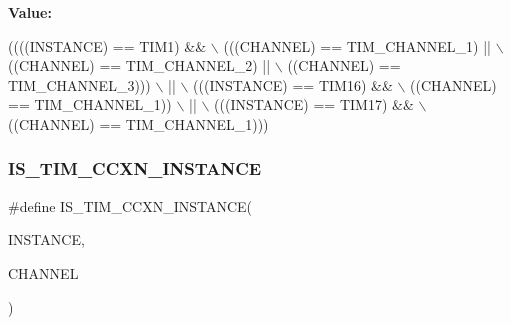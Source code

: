 {\bfseries Value\+:}
\begin{DoxyCode}
((((INSTANCE) == TIM1) &&                    \(\backslash\)
     (((CHANNEL) == TIM\_CHANNEL\_1) ||           \(\backslash\)
      ((CHANNEL) == TIM\_CHANNEL\_2) ||           \(\backslash\)
      ((CHANNEL) == TIM\_CHANNEL\_3)))            \(\backslash\)
    ||                                          \(\backslash\)
    (((INSTANCE) == TIM16) &&                   \(\backslash\)
     ((CHANNEL) == TIM\_CHANNEL\_1))              \(\backslash\)
    ||                                          \(\backslash\)
    (((INSTANCE) == TIM17) &&                   \(\backslash\)
     ((CHANNEL) == TIM\_CHANNEL\_1)))
\end{DoxyCode}
\mbox{\label{group___exported__macro_ga7181cfd1649c4e65e24b7c863e94a54f}} 
\subsubsection{\texorpdfstring{I\+S\+\_\+\+T\+I\+M\+\_\+\+C\+C\+X\+N\+\_\+\+I\+N\+S\+T\+A\+N\+CE}{IS\_TIM\_CCXN\_INSTANCE}\hspace{0.1cm}{\footnotesize\ttfamily [2/16]}}
{\footnotesize\ttfamily \#define I\+S\+\_\+\+T\+I\+M\+\_\+\+C\+C\+X\+N\+\_\+\+I\+N\+S\+T\+A\+N\+CE(\begin{DoxyParamCaption}\item[{}]{I\+N\+S\+T\+A\+N\+CE,  }\item[{}]{C\+H\+A\+N\+N\+EL }\end{DoxyParamCaption})}

